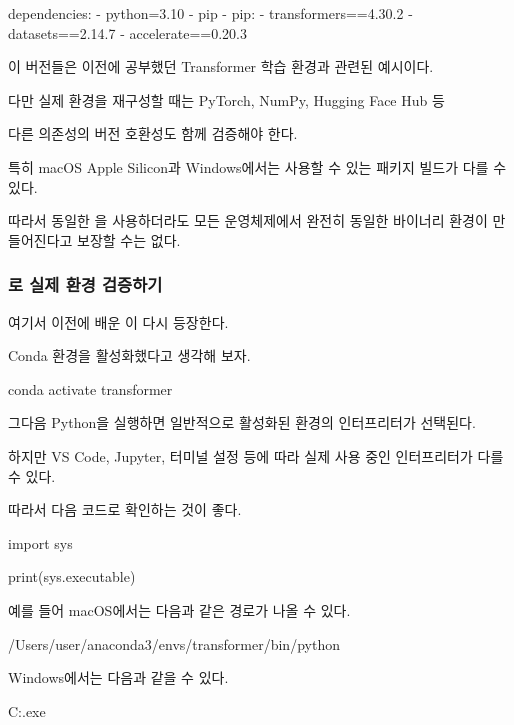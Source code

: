 \begin{dhkzsh}
dependencies:
  - python=3.10
  - pip
  - pip:
      - transformers==4.30.2
      - datasets==2.14.7
      - accelerate==0.20.3
\end{dhkzsh}

이 버전들은 이전에 공부했던 Transformer 학습 환경과 관련된 예시이다.

다만 실제 환경을 재구성할 때는 PyTorch, NumPy, Hugging Face Hub 등

다른 의존성의 버전 호환성도 함께 검증해야 한다.

특히 macOS Apple Silicon과 Windows에서는 사용할 수 있는 패키지 빌드가 다를 수 있다.

따라서 동일한 을 사용하더라도 모든 운영체제에서 완전히 동일한 바이너리 환경이 만들어진다고 보장할 수는 없다.

\subsubsection{로 실제 환경 검증하기}

여기서 이전에 배운 이 다시 등장한다.

Conda 환경을 활성화했다고 생각해 보자.

\begin{dhkzsh}
conda activate transformer
\end{dhkzsh}

그다음 Python을 실행하면 일반적으로 활성화된 환경의 인터프리터가 선택된다.

하지만 VS Code, Jupyter, 터미널 설정 등에 따라 실제 사용 중인 인터프리터가 다를 수 있다.

따라서 다음 코드로 확인하는 것이 좋다.

\begin{dhkcode}
import sys

print(sys.executable)
\end{dhkcode}

예를 들어 macOS에서는 다음과 같은 경로가 나올 수 있다.

\begin{dhkzsh}
/Users/user/anaconda3/envs/transformer/bin/python
\end{dhkzsh}

Windows에서는 다음과 같을 수 있다.

\begin{dhkzsh}
C:\Users\user{}\envs\transformer\python.exe
\end{dhkzsh}

